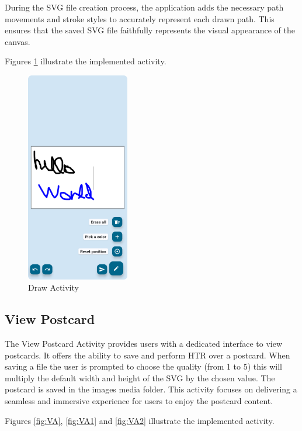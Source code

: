 During the SVG file creation process, the application adds the necessary path movements and stroke styles to accurately represent each drawn path. This ensures that the saved SVG file faithfully represents the visual appearance of the canvas.

Figures \ref{fig:DA1} illustrate the implemented activity.



\begin{figure}[!ht]
	\centering
	\includegraphics[trim={0cm -3cm 0 -3cm}, width=0.4\textwidth]{./Chapter6/Figures/DrawActivity}
	\caption{Draw Activity}
	\label{fig:DA1}
\end{figure}


\subsection{View Postcard}
The View Postcard Activity provides users with a dedicated interface to view postcards. It offers the ability to save and perform HTR over a postcard. 
When saving a file the user is prompted to choose the quality (from 1 to 5) this will multiply the default width and height of the SVG by the chosen value. The postcard is saved in the images media folder.
This activity focuses on delivering a seamless and immersive experience for users to enjoy the postcard content.

Figures \ref{fig:VA}, \ref{fig:VA1} and \ref{fig:VA2} illustrate the implemented activity.

